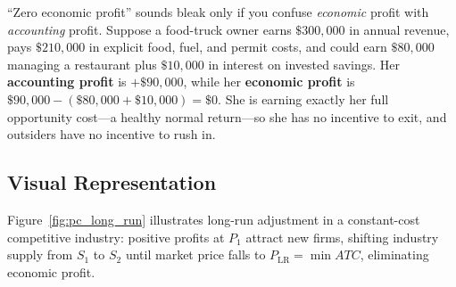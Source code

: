\documentclass[11pt,letterpaper]{article}
\begin{document}
\begin{tcolorbox}[colback=LightTerracotta,colframe=CourseOrange,title=\textbf{Clear It Up: Zero Economic Profit Does Not Mean Zero Accounting Profit}]
``Zero economic profit'' sounds bleak only if you confuse \emph{economic} profit with \emph{accounting} profit. Suppose a food-truck owner earns $\$300{,}000$ in annual revenue, pays $\$210{,}000$ in explicit food, fuel, and permit costs, and could earn $\$80{,}000$ managing a restaurant plus $\$10{,}000$ in interest on invested savings. Her \textbf{accounting profit} is $+\$90{,}000$, while her \textbf{economic profit} is $\$90{,}000 - (\$80{,}000 + \$10{,}000) = \$0$. She is earning exactly her full opportunity cost—a healthy normal return—so she has no incentive to exit, and outsiders have no incentive to rush in.
\end{tcolorbox}

\subsection*{Visual Representation}
Figure~\ref{fig:pc_long_run} illustrates long-run adjustment in a constant-cost competitive industry: positive profits at $P_1$ attract new firms, shifting industry supply from $S_1$ to $S_2$ until market price falls to $P_{\text{LR}} = \min ATC$, eliminating economic profit.
\end{document}
